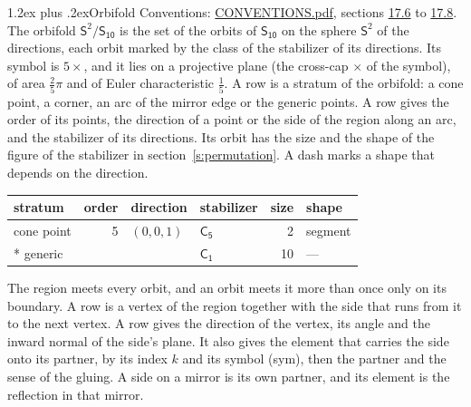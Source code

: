 \documentclass[10pt,a4paper]{article}
\makeatletter
\renewcommand\section{\@startsection{section}{1}{\z@}{-3ex plus -1ex minus -.2ex}%
  {1.2ex plus .2ex}{\normalfont\large\sffamily\bfseries\color{parttitle}}}
\numberwithin{equation}{section}
\newcommand{\grp}[1]{\mathsf{#1}}
\newcommand{\orbname}[1]{#1}
\newcommand{\dirvec}[3]{(#1, #2, #3)}
\newcommand{\twosphere}{\mathsf{S}^{2}}
\makeatother
\begin{document}
\section{Orbifold}\label{s:orbifold}
Conventions: \href{../../CONVENTIONS.pdf}{CONVENTIONS.pdf}, sections \href{../../CONVENTIONS.pdf\#conv.17.6}{17.6} to \href{../../CONVENTIONS.pdf\#conv.17.8}{17.8}.
The orbifold $\twosphere/\grp{S_{10}}$ is the set of the orbits of $\grp{S_{10}}$ on the sphere $\twosphere$ of the directions, each orbit marked by the class of the stabilizer of its directions. Its symbol is $\orbname{5{\times}}$, and it lies on a projective plane (the cross-cap ${\times}$ of the symbol), of area $\tfrac{2}{5}\pi$ and of Euler characteristic $\tfrac{1}{5}$.
\leavevmode\label{n:head.stratum}\label{n:head.order.point}\label{n:head.direction}\label{n:head.stabilizer}\label{n:head.size.orbit}\label{n:head.shape}A row is a stratum of the orbifold: a cone point, a corner, an arc of the mirror edge or the generic points. A row gives the order of its points, the direction of a point or the side of the region along an arc, and the stabilizer of its directions. Its orbit has the size and the shape of the figure of the stabilizer in section~\ref{s:permutation}. A dash marks a shape that depends on the direction.
{\small\setlength{\tabcolsep}{4pt}\begin{longtable}{@{}lrllrl@{}}\toprule
stratum & order & direction & stabilizer & size & shape\\\midrule\endhead
\bottomrule\endfoot\endlastfoot
cone point & 5 & $\dirvec{0}{0}{1}$ & \href{C5.pdf}{$\grp{C_{5}}$} & 2 & segment\\*
generic &  &  & \href{C1.pdf}{$\grp{C_{1}}$} & 10 & ---\\
\bottomrule\end{longtable}}
\leavevmode\label{n:head.vertex.region}\label{n:head.angle}\label{n:head.normal.side}\label{n:head.partner}\label{n:head.sense}The region meets every orbit, and an orbit meets it more than once only on its boundary. A row is a vertex of the region together with the side that runs from it to the next vertex. A row gives the direction of the vertex, its angle and the inward normal of the side's plane. It also gives the element that carries the side onto its partner, by its index $k$ and its symbol (sym), then the partner and the sense of the gluing. A side on a mirror is its own partner, and its element is the reflection in that mirror.
\end{document}
